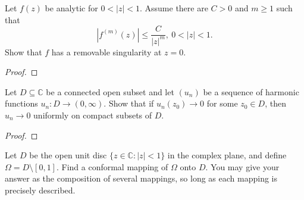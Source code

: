 \documentclass{article}
\newenvironment{problem}[2][Problem]{\begin{trivlist}
\item[\hskip \labelsep {\bfseries #1}\hskip \labelsep {\bfseries #2.}]}{\end{trivlist}}
\begin{document}
\pagebreak

\begin{problem}{2}
  Let $f(z)$ be analytic for $0 < |z| < 1$. Assume there are $C > 0$ and
  $m \geq 1$ such that \[
    |f^{(m)}(z)| \leq \frac{C}{|z|^m},\ 0 < |z| < 1.
  \]
  Show that $f$ has a removable singularity at $z = 0$.
\end{problem}

\begin{proof}
\end{proof}

\pagebreak

\begin{problem}{3} Let $D \subseteq \mathbb{C}$ be a connected open subset and
  let $(u_n)$ be a sequence of harmonic functions
  $u_n\colon D \rightarrow (0, \infty)$.
  Show that if $u_n(z_0) \rightarrow 0$ for some $z_0 \in D$, then
  $u_n \rightarrow 0$ uniformly on compact subsets of $D$.
\end{problem}

\begin{proof}
\end{proof}

\pagebreak

\begin{problem}{4}
  Let $D$ be the open unit disc $\{ z \in \mathbb{C} : |z| < 1 \}$ in the
  complex plane, and define $\Omega = D \setminus [0, 1]$. Find a conformal
  mapping of $\Omega$ onto $D$. You may give your answer as the composition of
  several mappings, so long as each mapping is precisely described.
\end{problem}
\end{document}
